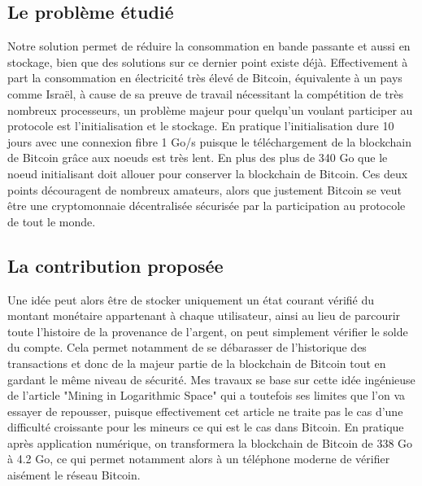 \documentclass{article}
\newenvironment{point}[1]%
{\subsection*{#1}}%
{}
\begin{document}
\begin{point}{Le problème étudié}
  
	Notre solution permet de réduire la consommation en bande passante et aussi en stockage, bien que des solutions sur ce dernier point existe déjà. Effectivement à part la consommation en électricité très élevé de Bitcoin, équivalente à un pays comme Israël, à cause de sa preuve de travail nécessitant la compétition de très nombreux processeurs, un problème majeur pour quelqu'un voulant participer au protocole est l'initialisation et le stockage. En pratique l'initialisation dure 10 jours avec une connexion fibre 1 Go/s puisque le téléchargement de la blockchain de Bitcoin grâce aux noeuds est très lent. En plus des plus de 340 Go que le noeud initialisant doit allouer pour conserver la blockchain de Bitcoin. Ces deux points découragent de nombreux amateurs, alors que justement Bitcoin se veut être une cryptomonnaie décentralisée sécurisée par la participation au protocole de tout le monde.
	

\end{point}

\begin{point}{La contribution proposée}

	Une idée peut alors être de stocker uniquement un état courant vérifié du montant monétaire appartenant à chaque utilisateur, ainsi au lieu de parcourir toute l'histoire de la provenance de l'argent, on peut simplement vérifier le solde du compte. Cela permet notamment de se débarasser de l'historique des transactions et donc de la majeur partie de la blockchain de Bitcoin tout en gardant le même niveau de sécurité. Mes travaux se base sur cette idée ingénieuse de l'article "Mining in Logarithmic Space" qui a toutefois ses limites que l'on va essayer de repousser, puisque effectivement cet article ne traite pas le cas d'une difficulté croissante pour les mineurs ce qui est le cas dans Bitcoin. En pratique après application numérique, on transformera la blockchain de Bitcoin de 338 Go à 4.2 Go, ce qui permet notamment alors à un téléphone moderne de vérifier aisément le réseau Bitcoin.\\

 
\end{point}
\end{document}

